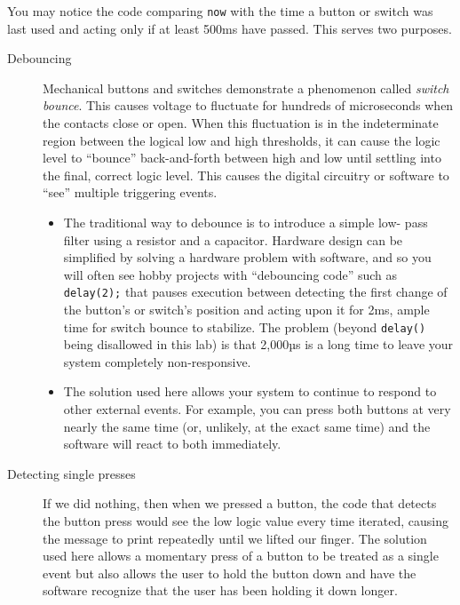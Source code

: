 You may notice the code comparing \lstinline{now} with the time a button or
switch was last used and acting only if at least 500ms have passed. This serves
two purposes.
\begin{description}
\item [Debouncing] Mechanical buttons and switches demonstrate a phenomenon
    called \textit{switch bounce}. This causes voltage to fluctuate for
    hundreds of microseconds when the contacts close or open. When this
    fluctuation is in the indeterminate region between the logical low and high
    thresholds, it can cause the logic level to ``bounce'' back-and-forth
    between high and low until settling into the final, correct logic level.
    This causes the digital circuitry or software to ``see'' multiple
    triggering events. \\
    \begin{itemize}
    \item The traditional way to debounce is to introduce a simple low-
    pass filter using a resistor and a capacitor. Hardware design can be
    simplified by solving a hardware problem with software, and so you will
    often see hobby projects with ``debouncing code'' such as
    \lstinline{delay(2);} that pauses execution between detecting the first
    change of the button's or switch's position and acting upon it for 2ms,
    ample time for switch bounce to stabilize. The problem (beyond
    \lstinline{delay()} being disallowed in this lab) is that
    2,000µs is a long time to leave your system completely non-responsive.
    \item The solution used here allows your system to continue to respond to
    other external events. For example, you can press both buttons at very
    nearly the same time (or, unlikely, at the exact same time) and the
    software will react to both immediately.
    \end{itemize}
\item [Detecting single presses] If we did nothing, then when we pressed a
    button, the code that detects the button press would see the low logic
    value every time  iterated, causing the message to print
    repeatedly until we lifted our finger. The solution used here allows a
    momentary press of a button to be treated as a single event but also allows
    the user to hold the button down and have the software recognize that the
    user has been holding it down longer.
\end{description}

